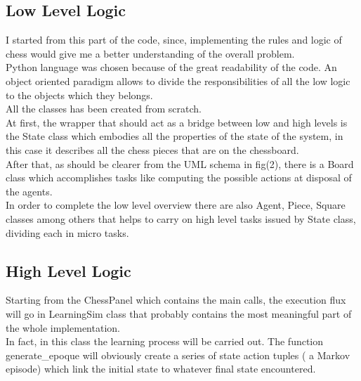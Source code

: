 \documentclass{article}
\begin{document}
				\subsection{Low Level Logic}
				I started from this part of the code, since, implementing the rules and logic of chess would give me a better understanding of the overall problem.\medskip\\
				Python language was chosen because of the great readability of the code. An object oriented paradigm allows to divide the responsibilities of all the low logic to the objects which they belongs.\medskip\\
				All the classes has been created from scratch.\medskip\\
				At first, the wrapper that should act as a bridge between low and high levels is the State class which embodies all the properties of the state of the system, in this case it describes all the chess pieces that are on the chessboard.\medskip\\
				After that, as should be clearer from the UML schema in fig(2), there is a Board class which accomplishes tasks like computing the possible actions at disposal of the agents.\medskip\\
				In order to complete the low level overview there are also Agent, Piece, Square classes among others that helps to carry on high level tasks issued by State class, dividing each in micro tasks.



				\subsection{High Level Logic}
				Starting from the ChessPanel which contains the main calls, the execution flux will go in LearningSim class that probably contains the most meaningful part of the whole implementation.\medskip\\
				In fact, in this class the learning process will be carried out.   The function generate\_epoque will obviously create a series of state action tuples ( a Markov episode) which link the initial state to whatever final state encountered.
\end{document}
